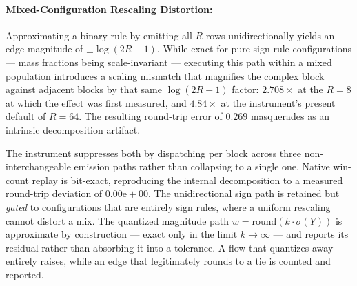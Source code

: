 \paragraph{Mixed-Configuration Rescaling Distortion:} Approximating a binary rule
by emitting all $R$ rows unidirectionally yields an edge magnitude of
$\pm\log(2R - 1)$. While exact for pure sign-rule configurations --- mass
fractions being scale-invariant --- executing this path within a mixed population
introduces a scaling mismatch that magnifies the complex block against adjacent
blocks by that same $\log(2R-1)$ factor: $2.708\times$ at the $R = 8$ at which
the effect was first measured, and $4.84\times$ at the instrument's present
default of $R = 64$. The resulting round-trip error of $0.269$ masquerades as an
intrinsic decomposition artifact.

The instrument suppresses both by dispatching per block across three
non-interchangeable emission paths rather than collapsing to a single one.
Native win-count replay is bit-exact, reproducing the internal decomposition to a
measured round-trip deviation of $0.00\mathrm{e}{+}00$. The unidirectional sign
path is retained but \emph{gated} to configurations that are entirely sign rules,
where a uniform rescaling cannot distort a mix. The quantized magnitude path
$w = \text{round}(k \cdot \sigma(Y))$ is approximate by construction --- exact
only in the limit $k \to \infty$ --- and reports its residual rather than
absorbing it into a tolerance. A flow that quantizes away entirely raises, while
an edge that legitimately rounds to a tie is counted and reported.
